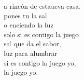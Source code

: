 \begin{cancion}
\begin{chorus}
		a rincón de estaueva casa.\\
		 pones tu la sal \\
		o enciendo la luz\\
		 solo si es contigo  la juego\\
		 sal que da el sabor, \\
		luz para alumbrar\\
		 si es contigo  la juego yo, \\
		 la juego yo.\jump\\
	\end{chorus}%
\end{cancion}%
